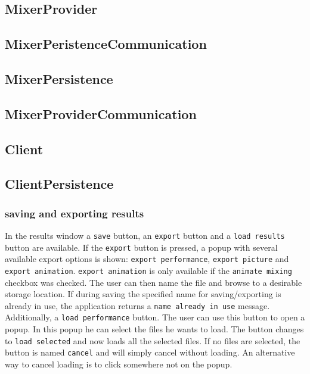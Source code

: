 \subsection{MixerProvider}

\subsection{MixerPeristenceCommunication}

\subsection{MixerPersistence}

\subsection{MixerProviderCommunication}

\subsection{Client}

\subsection{ClientPersistence}

\subsubsection{saving and exporting results}
In the results window a \texttt{save} button, an \texttt{export} button and a \texttt{load results} button are available. If the \texttt{export} button is pressed, a popup with several available export options is shown: \texttt{export performance}, \texttt{export picture} and \texttt{export animation}. \texttt{export animation} is only available if the \texttt{animate mixing} checkbox was checked. The user can then name the file and browse to a desirable storage location. If during saving the specified name for saving/exporting is already in use, the application returns a \texttt{name already in use} message. Additionally, a \texttt{load performance} button. The user can use this button to open a popup. In this popup he can select the files he wants to load. The button changes to \texttt{load selected} and now loads all the selected files. If no files are selected, the button is named \texttt{cancel} and will simply cancel without loading. An alternative way to cancel loading is to click somewhere not on the popup.

